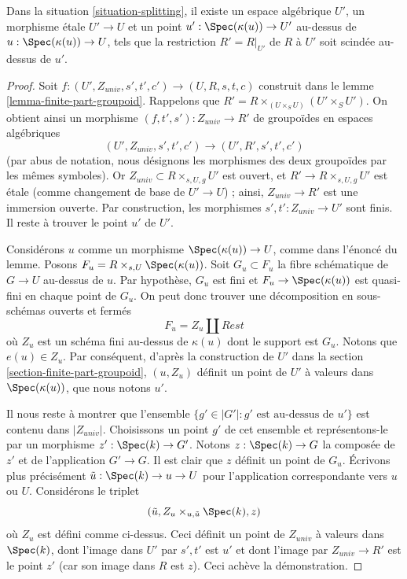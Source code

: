 \begin{lemma}
\label{lemma-splitting}
Dans la situation \ref{situation-splitting},
il existe un espace algébrique $U'$, un morphisme \'etale
$U' \to U$ et un point $u' : \Spec(\kappa(u)) \to U'$
au-dessus de $u : \Spec(\kappa(u)) \to U$,
tels que la restriction $R' = R|_{U'}$ de $R$ à $U'$
soit scindée au-dessus de $u'$.
\end{lemma}

\begin{proof}
Soit $f : (U', Z_{univ}, s', t', c') \to (U, R, s, t, c)$ construit dans le
lemme \ref{lemma-finite-part-groupoid}.
Rappelons que $R' = R \times_{(U \times_S U)} (U' \times_S U')$.
On obtient ainsi un morphisme $(f, t', s') : Z_{univ} \to R'$ de groupoïdes
en espaces algébriques
$$
(U', Z_{univ}, s', t', c') \to (U', R', s', t', c')
$$
(par abus de notation, nous désignons les morphismes des deux groupoïdes
par les mêmes symboles). Or $Z_{univ} \subset R \times_{s, U, g} U'$ est ouvert,
et $R' \to R \times_{s, U, g} U'$ est \'etale (comme changement de base
de $U' \to U$) ; ainsi, $Z_{univ} \to R'$ est une immersion ouverte.
Par construction, les morphismes $s', t' : Z_{univ} \to U'$ sont finis.
Il reste à trouver le point $u'$ de $U'$.

\medskip\noindent
Considérons $u$ comme un morphisme $\Spec(\kappa(u)) \to U$, comme dans
l'énoncé du lemme. Posons $F_u = R \times_{s, U} \Spec(\kappa(u))$.
Soit $G_u \subset F_u$ la fibre schématique de $G \to U$ au-dessus de $u$.
Par hypothèse, $G_u$ est fini et $F_u \to \Spec(\kappa(u))$
est quasi-fini en chaque point de $G_u$.
On peut donc trouver une décomposition en sous-schémas ouverts et fermés
$$
F_u = Z_u \amalg Rest
$$
où $Z_u$ est un schéma fini au-dessus de $\kappa(u)$ dont le support est $G_u$.
Notons que $e(u) \in Z_u$. Par conséquent, d'après la construction de $U'$ dans la
section \ref{section-finite-part-groupoid},
$(u, Z_u)$ définit un point de $U'$ à valeurs dans
$\Spec(\kappa(u))$, que nous notons $u'$.

\medskip\noindent
Il nous reste à montrer que l'ensemble $\{g' \in |G'| : g'\text{ est au-dessus de }u'\}$
est contenu dans $|Z_{univ}|$. Choisissons un point $g'$ de cet ensemble et
représentons-le par un morphisme $z' : \Spec(k) \to G'$. Notons
$z : \Spec(k) \to G$ la composée de $z'$ et de l'application $G' \to G$.
Il est clair que $z$ définit un point de $G_u$. Écrivons plus précisément
$\tilde u : \Spec(k) \to u \to U$ pour l'application correspondante vers $u$ ou $U$.
Considérons le triplet
$$
(\tilde u, Z_u \times_{u, \tilde u} \Spec(k), z)
$$
où $Z_u$ est défini comme ci-dessus. Ceci définit un point de $Z_{univ}$
à valeurs dans $\Spec(k)$, dont l'image dans $U'$ par $s', t'$ est $u'$ et
dont l'image par $Z_{univ} \to R'$ est le point $z'$
(car son image dans $R$ est $z$).
Ceci achève la démonstration.
\end{proof}

